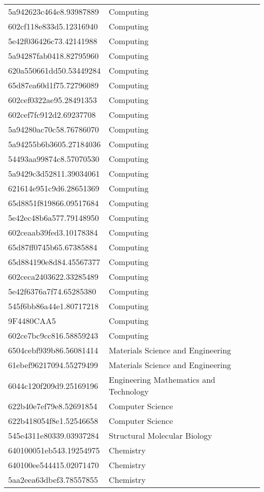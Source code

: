 \begin{tabular}{ll}
5a942623c464e8.93987889 & Computing \\
602cf118e833d5.12316940 & Computing \\
5e42f036426c73.42141988 & Computing \\
5a94287fab0418.82795960 & Computing \\
620a550661dd50.53449284 & Computing \\
65d87ea60d1f75.72796089 & Computing \\
602cef0322ae95.28491353 & Computing \\
602cef7fc912d2.69237708 & Computing \\
5a94280ac70c58.76786070 & Computing \\
5a94255b6b3605.27184036 & Computing \\
54493aa99874c8.57070530 & Computing \\
5a9429c3d52811.39034061 & Computing \\
621614e951c9d6.28651369 & Computing \\
65d8851f819866.09517684 & Computing \\
5e42ec48b6a577.79148950 & Computing \\
602ceaab39fed3.10178384 & Computing \\
65d87ff0745b65.67385884 & Computing \\
65d884190e8d84.45567377 & Computing \\
602ceca2403622.33285489 & Computing \\
5e42f6376a7f74.65285380 & Computing \\
545f6bb86a44e1.80717218 & Computing \\
9F4480CAA5 & Computing \\
602ce7bc9cc816.58859243 & Computing \\
6504cebf939b86.56081414 & Materials Science and Engineering \\
61ebef96217094.55279499 & Materials Science and Engineering \\
6044c120f209d9.25169196 & Engineering Mathematics and Technology \\
622b40e7ef79e8.52691854 & Computer Science \\
622b418054f8e1.52546658 & Computer Science \\
545e4311e80339.03937284 & Structural Molecular Biology \\
640100051eb543.19254975 & Chemistry \\
640100ee544415.02071470 & Chemistry \\
5aa2eea63dbef3.78557855 & Chemistry \\

\end{tabular}
